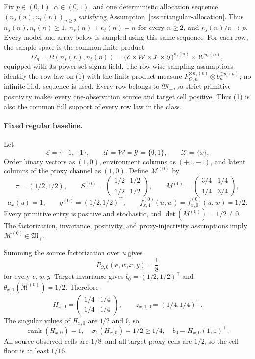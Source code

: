 Fix \(p\in(0,1)\), \(\alpha\in(0,1)\), and one deterministic allocation sequence \((n_s(n),n_t(n))_{n\ge2}\) satisfying Assumption~\ref{ass:triangular-allocation}. Thus \(n_s(n),n_t(n)\ge1\), \(n_s(n)+n_t(n)=n\) for every \(n\ge2\), and \(n_s(n)/n\to p\). Every model and array below is sampled using this same sequence. For each row, the sample space is the common finite product
\[
\Omega_n=\Omega(n_s(n),n_t(n))
=\bigl(\mathcal E\times\mathcal W\times\mathcal X\times\mathcal Y\bigr)^{n_s(n)}
\times\mathcal W^{n_t(n)},
\tag{1}
\]
equipped with its power-set sigma-field. The row-wise sampling assumptions identify the row law on (1) with the finite product measure \(P_{O,n}^{\otimes n_s(n)}\otimes b_n^{\otimes n_t(n)}\); no infinite i.i.d. sequence is used. Every row belongs to \(\mathfrak M_{+}\), so strict primitive positivity makes every one-observation source and target cell positive. Thus (1) is also the common full support of every row law in the class.

\paragraph{Fixed regular baseline.}
Let
\[
\mathcal E=\{-1,+1\},\qquad
\mathcal U=\mathcal W=\mathcal Y=\{0,1\},\qquad
\mathcal X=\{x\}.
\]
Order binary vectors as \((1,0)\), environment columns as \((+1,-1)\), and latent columns of the proxy channel as \((1,0)\). Define \(\mathcal M^{(0)}\) by
\[
\pi=(1/2,1/2),\qquad
S^{(0)}=\begin{pmatrix}1/2&1/2\\1/2&1/2\end{pmatrix},\qquad
M^{(0)}=\begin{pmatrix}3/4&1/4\\1/4&3/4\end{pmatrix},
\]
\[
a_x(u)=1,\qquad q^{(0)}=(1/2,1/2)^{\top},\qquad
f^{(0)}_{x,1}(u,w)=f^{(0)}_{x,0}(u,w)=1/2.
\tag{2}
\]
Every primitive entry is positive and stochastic, and \(\det(M^{(0)})=1/2\ne0\). The factorization, invariance, positivity, and proxy-injectivity assumptions imply \(\mathcal M^{(0)}\in\mathfrak M_{+}\).

Summing the source factorization over \(u\) gives
\[
P_{O,0}(e,w,x,y)=\frac18
\tag{3}
\]
for every \(e,w,y\). Target invariance gives \(b_0=(1/2,1/2)^{\top}\) and \(\theta_{x,1}(\mathcal M^{(0)})=1/2\). Therefore
\[
H_{x,0}=\begin{pmatrix}1/4&1/4\\1/4&1/4\end{pmatrix},
\qquad z_{x,1,0}=(1/4,1/4)^{\top}.
\tag{4}
\]
The singular values of \(H_{x,0}\) are \(1/2\) and \(0\), so
\[
\operatorname{rank}(H_{x,0})=1,
\quad \sigma_1(H_{x,0})=1/2\ge1/4,
\quad b_0=H_{x,0}(1,1)^{\top}.
\tag{5}
\]
All source observed cells are \(1/8\), and all target proxy cells are \(1/2\), so the cell floor is at least \(1/16\).

